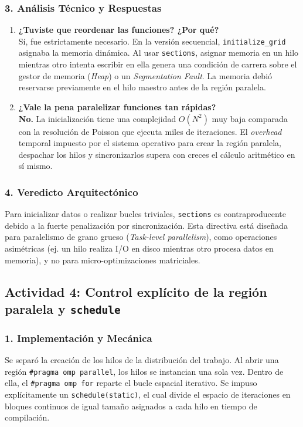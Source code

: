 \documentclass[11pt,a4paper]{article}
\begin{document}
\subsubsection*{3. Análisis Técnico y Respuestas}

\begin{enumerate}
    \item \textbf{¿Tuviste que reordenar las funciones? ¿Por qué?} \\
    Sí, fue estrictamente necesario. En la versión secuencial, \texttt{initialize\_grid} asignaba la memoria dinámica. Al usar \texttt{sections}, asignar memoria en un hilo mientras otro intenta escribir en ella genera una condición de carrera sobre el gestor de memoria (\textit{Heap}) o un \textit{Segmentation Fault}. La memoria debió reservarse previamente en el hilo maestro antes de la región paralela.

    \item \textbf{¿Vale la pena paralelizar funciones tan rápidas?} \\
    \textbf{No.} La inicialización tiene una complejidad $O(N^2)$ muy baja comparada con la resolución de Poisson que ejecuta miles de iteraciones. El \textit{overhead} temporal impuesto por el sistema operativo para crear la región paralela, despachar los hilos y sincronizarlos supera con creces el cálculo aritmético en sí mismo.
\end{enumerate}

\subsubsection*{4. Veredicto Arquitectónico}
Para inicializar datos o realizar bucles triviales, \texttt{sections} es contraproducente debido a la fuerte penalización por sincronización. Esta directiva está diseñada para paralelismo de grano grueso (\textit{Task-level parallelism}), como operaciones asimétricas (ej. un hilo realiza I/O en disco mientras otro procesa datos en memoria), y no para micro-optimizaciones matriciales.
\subsection*{Actividad 4: Control explícito de la región paralela y \texttt{schedule}}

\subsubsection*{1. Implementación y Mecánica}
Se separó la creación de los hilos de la distribución del trabajo. Al abrir una región \texttt{\#pragma omp parallel}, los hilos se instancian una sola vez. Dentro de ella, el \texttt{\#pragma omp for} reparte el bucle espacial iterativo. Se impuso explícitamente un \texttt{schedule(static)}, el cual divide el espacio de iteraciones en bloques continuos de igual tamaño asignados a cada hilo en tiempo de compilación.
\end{document}
